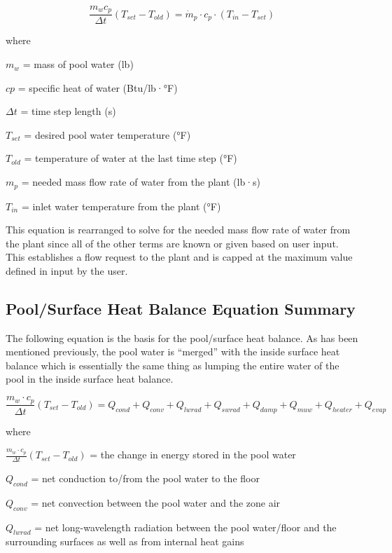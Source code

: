 \begin{equation}
\frac{m_w c_p}{\Delta t} (T_{set}-T_{old}) = \dot{m}_p \cdot c_p \cdot (T_{in} - T_{set} )
\end{equation}

where

\(m_w\) = mass of pool water (lb)

\(cp\) = specific heat of water (Btu/lb·°F)

\(\Delta t\) = time step length (s)

\(T_{set}\) = desired pool water temperature (°F)

\(T_{old}\) = temperature of water at the last time step (°F)

\(m_p\) = needed mass flow rate of water from the plant (lb·s)

\(T_{in}\) = inlet water temperature from the plant (°F)

This equation is rearranged to solve for the needed mass flow rate of water from the plant since all of the other terms are known or given based on user input. This establishes a flow request to the plant and is capped at the maximum value defined in input by the user.

\subsection{Pool/Surface Heat Balance Equation Summary}\label{poolsurface-heat-balance-equation-summary}

The following equation is the basis for the pool/surface heat balance. As has been mentioned previously, the pool water is ``merged'' with the inside surface heat balance which is essentially the same thing as lumping the entire water of the pool in the inside surface heat balance.

\begin{equation}
\frac{m_w \cdot c_p}{\Delta t} (T_{set} - T_{old}) = Q_{cond} + Q_{conv} + Q_{lwrad} + Q_{swrad} + Q_{damp} + Q_{muw} + Q_{heater} + Q_{evap}
\end{equation}

where

\(\frac{m_w \cdot c_p}{\Delta t} (T_{set} - T_{old} )\) = the change in energy stored in the pool water

\(Q_{cond}\) = net conduction to/from the pool water to the floor

\(Q_{conv}\) = net convection between the pool water and the zone air

\(Q_{lwrad}\) = net long-wavelength radiation between the pool water/floor and the surrounding surfaces as well as from internal heat gains

